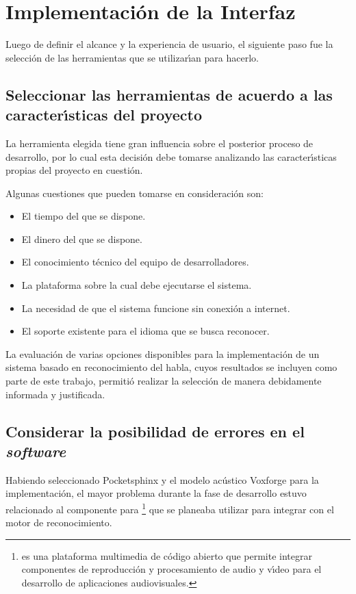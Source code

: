 \section{Implementaci\'on de la Interfaz}
\label{sec:implementacion-interfaz}

Luego de definir el alcance y la experiencia de usuario, el siguiente paso
fue la selecci\'on de las herramientas que se utilizar{\'\i}an para hacerlo. 

\subsection{Seleccionar las herramientas de acuerdo a las \mbox{caracter{\'\i}sticas} del proyecto}
La herramienta elegida tiene gran influencia sobre el posterior proceso de
desarrollo, por lo cual esta decisi\'on debe tomarse analizando las caracter{\'\i}sticas
propias del proyecto en cuesti\'on.

Algunas cuestiones que pueden tomarse en consideraci\'on son:

\begin{itemize}
    \item El tiempo del que se dispone.
    \item El dinero del que se dispone.
    \item El conocimiento t\'ecnico del equipo de desarrolladores.
    \item La plataforma sobre la cual debe ejecutarse el sistema.
    \item La necesidad de que el sistema funcione sin conexi\'on a internet.
    \item El soporte existente para el idioma que se busca reconocer.
\end{itemize}

La evaluaci\'on de varias opciones disponibles para la implementaci\'on de un sistema
basado en reconocimiento del habla, cuyos resultados se incluyen como parte de este
trabajo, permiti\'o realizar la selecci\'on de manera debidamente informada y justificada.

\subsection{Considerar la posibilidad de errores en el \emph{software}}
Habiendo seleccionado Pocketsphinx y el modelo ac\'ustico Voxforge para
la implementaci\'on, el mayor problema durante la fase de desarrollo estuvo relacionado
al componente para \footnote{ es una plataforma multimedia
de c\'odigo abierto que permite integrar componentes de reproducci\'on y procesamiento de audio y v{\'\i}deo
para el desarrollo de aplicaciones audiovisuales.}
\cite{GstreamerPocketsphinx} que se planeaba utilizar 
para integrar  con el motor de reconocimiento.


